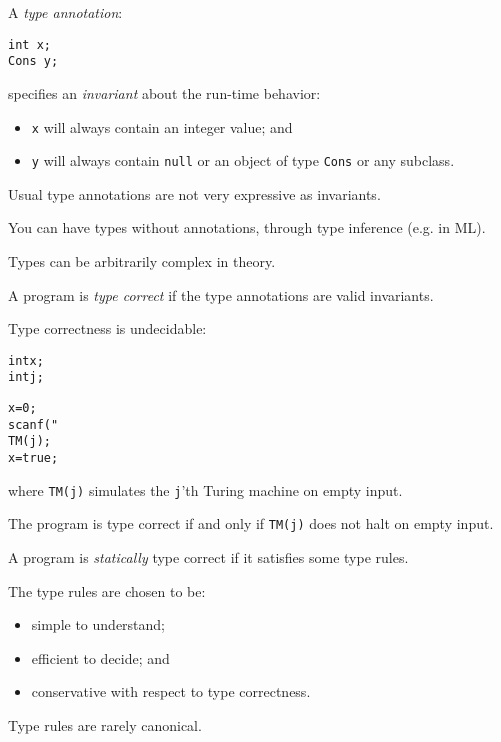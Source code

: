 \begin{slide*}
A {\em type annotation}:

\begin{verbatim} 
int x;
Cons y;
\end{verbatim}

specifies an {\em invariant\/} about the run-time behavior:

\begin{itemize}
\item {\tt x} will always contain an integer value; and
\item {\tt y} will always contain {\tt null} or an object of type {\tt Cons}
or any subclass.
\end{itemize}

Usual type annotations are not very expressive as invariants.

You can have types without annotations, through type inference (e.g. in ML).

Types can be arbitrarily complex in theory.
\vfil
\end{slide*}
 
\begin{slide*}
A program is {\em type correct\/} if the type annotations are
valid invariants.

Type correctness is undecidable:

\begin{alltt}
int x;
int j;

x = 0;
scanf("%i",&j);
TM(j);
x = true;
\end{alltt}

where {\tt TM(j)} simulates the {\tt j}'th Turing machine on empty input.

The program is type correct if and only if {\tt TM(j)} does not halt on empty input.
\vfil
\end{slide*}
 
\begin{slide*}
A program is {\em statically\/} type correct if it satisfies some type rules.

The type rules are chosen to be:
\begin{itemize}
\item simple to understand;
\item efficient to decide; and
\item conservative with respect to type correctness.
\end{itemize}

Type rules are rarely canonical.
\vfil
\end{slide*}
 
